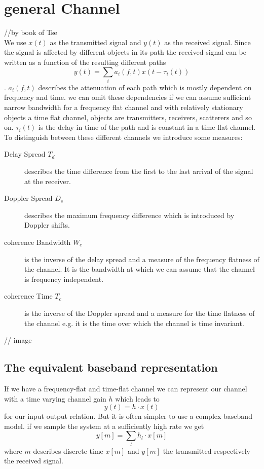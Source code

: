 \section{general Channel}
//by book of Tse\\
We use $x(t)$ as the transmitted signal and $y(t)$ as the received signal. Since the signal is affected by different objects in its path the received signal can be written as a function of the resulting different paths $$y(t)=\sum_i{a_i(f,t)x(t-\tau_i(t))}$$. $a_i(f,t)$ describes the attenuation of each path which is mostly dependent on frequency and time. we can omit these dependencies if we can assume sufficient narrow bandwidth for a frequency flat channel and with relatively stationary objects a time flat channel, objects are transmitters, receivers, scatterers and so on. $\tau_i(t)$ is the delay in time of the path and is constant in a time flat channel.\\
To distinguish between these different channels we introduce some measures:
\begin{description}
	\item[Delay Spread $T_d$] describes the time difference from the first to the last arrival of the signal at the receiver.
	\item[Doppler Spread $D_s$] describes the maximum frequency difference which is introduced by Doppler shifts.
	\item[coherence Bandwidth $W_c$] is the inverse of the delay spread and a measure of the frequency flatness of the channel. It is the bandwidth at which we can assume that the channel is frequency independent.
	\item[coherence Time $T_c$] is the inverse of the Doppler spread and a measure for the time flatness of the channel e.g. it is the time over which the channel is time invariant. 
\end{description}
// image

\subsection{The equivalent baseband representation}
If we have a frequency-flat and time-flat channel we can represent our channel with a time varying channel gain $h$ which leads to $$y(t) = h \cdot x(t)$$ for our input output relation. But it is often simpler to use a complex baseband model. if we sample the system at a sufficiently high rate we get $$y[m] = \sum_l{h_l \cdot x[m]}$$ where $m$ describes discrete time $x[m]$ and $y[m]$ the transmitted respectively the received signal.  

